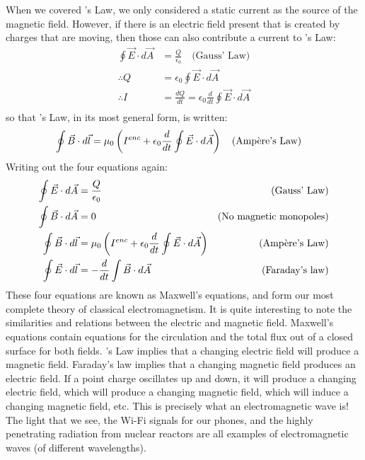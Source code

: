 When we covered \ampere's Law, we only considered a static current as the source of the magnetic field. However, if there is an electric field present that is created by charges that are moving, then those can also contribute a current to \ampere's Law:
\begin{align*}
\oint \vec E\cdot d\vec A &= \frac{Q}{\epsilon_0}\quad \text{(Gauss' Law)}\\
\therefore Q &= \epsilon_0 \oint \vec E\cdot d\vec A\\
\therefore I &= \frac{dQ}{dt} = \epsilon_0\frac{d}{dt} \oint \vec E\cdot d\vec A\\
\end{align*}
so that \ampere's Law, in its most general form, is written:
\begin{align*}
\oint \vec B\cdot d\vec l &= \mu_0 \left(I^{enc}+\epsilon_0\frac{d}{dt} \oint \vec E\cdot d\vec A\right)\quad \text{(\ampere's Law)}
\end{align*}
Writing out the four equations again:
\begin{align*}
\oint \vec E\cdot d\vec A &= \frac{Q}{\epsilon_0} &\text{(Gauss' Law)}\\
\oint \vec B\cdot d\vec A &= 0 &\text{(No magnetic monopoles)}\\
\oint \vec B\cdot d\vec l &= \mu_0 \left(I^{enc}+\epsilon_0\frac{d}{dt} \oint \vec E\cdot d\vec A\right) &\text{(\ampere's Law)}\\
\oint \vec E\cdot d\vec l &= -\frac{d}{dt}\int \vec B\cdot d\vec A  &\text{(Faraday's law)}\\
\end{align*}
These four equations are known as Maxwell's equations, and form our most complete theory of classical electromagnetism. It is quite interesting to note the similarities and relations between the electric and magnetic field. Maxwell's equations contain equations for the circulation and the total flux out of a closed surface for both fields. \ampere's Law implies that a changing electric field will produce a magnetic field. Faraday's law implies that a changing magnetic field produces an electric field. If a point charge oscillates up and down, it will produce a changing electric field, which will produce a changing magnetic field, which will induce a changing magnetic field, etc. This is precisely what an electromagnetic wave is! The light that we see, the Wi-Fi signals for our phones, and the highly penetrating radiation from nuclear reactors are all examples of electromagnetic waves (of different wavelengths). 

